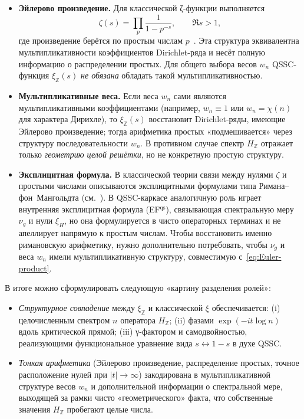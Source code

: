 \documentclass{article}
\numberwithin{equation}{section}
\theoremstyle{plain}
\theoremstyle{definition}
\theoremstyle{remark}
\def\leftrightarrow{↔}%
\def\infty{∞}\def\partial{∂}\def\sum{Σ}\def\int{∫}%
\begin{document}
\begin{itemize}
  \item
  \textbf{Эйлерово произведение.}
  Для классической ζ-функции выполняется
  \begin{equation}
  \label{eq:Euler-product}
  \zeta(s)
  =
  \prod_{p}
  \frac{1}{1-p^{-s}},
  \qquad \Re s>1,
  \end{equation}
  где произведение берётся по простым числам $p$~\cite{Titchmarsh1986}.
  Эта структура эквивалентна мультипликативности коэффициентов
  Dirichlet-ряда и несёт полную информацию о распределении простых.
  Для общего выбора весов $w_n$ QSSC-функция $\xi_{\mathbb Z}(s)$
  \emph{не обязана} обладать такой мультипликативностью.

  \item
  \textbf{Мультипликативные веса.}
  Если веса $w_n$ сами являются мультипликативными
  коэффициентами (например, $w_n\equiv 1$ или $w_n=\chi(n)$ для
  характера Дирихле), то $\xi_{\mathbb Z}(s)$ восстановит
  Dirichlet-ряды, имеющие Эйлерово произведение; тогда
  арифметика простых «подмешивается» через структуру
  последовательности $w_n$. В противном случае спектр $H_{\mathbb Z}$
  отражает только \emph{геометрию целой решётки}, но не конкретную
  простую структуру.

  \item
  \textbf{Эксплицитная формула.}
  В классической теории связи между нулями $\zeta$ и простыми числами
  описываются эксплицитными формулами типа Римана–фон~Мангольдта
  (см.~\cite{Edwards1974,Connes1994}). В QSSC-каркасе аналогичную роль
  играет внутренняя эксплицитная формула (EF$^{\mathrm{qs}}$),
  связывающая спектральную меру $\nu_g$ и нули $\xi_H$, но она формулируется
  в чисто операторных терминах и не апеллирует напрямую к простым
  числам. Чтобы восстановить именно римановскую арифметику, нужно
  дополнительно потребовать, чтобы $\nu_g$ и веса $w_n$ имели
  мультипликативную структуру, совместимую с~\eqref{eq:Euler-product}.
\end{itemize}

\medskip
\noindent
В итоге можно сформулировать следующую «картину разделения ролей»:

\begin{itemize}
  \item
  \emph{Структурное совпадение} между $\xi_{\mathbb Z}$ и классической
  $\xi$ обеспечивается:
  (i) целочисленным спектром $n$ оператора $H_{\mathbb Z}$;
  (ii) фазами $\exp(-it\log n)$ вдоль критической прямой;
  (iii) γ-фактором и самодвойностью, реализующими функциональное
  уравнение вида $s\leftrightarrow 1-s$ в духе QSSC.

  \item
  \emph{Тонкая арифметика} (Эйлерово произведение, распределение простых,
  точное расположение нулей при $|t|\to\infty$) закодирована в
  мультипликативной структуре весов $w_n$ и дополнительной информации
  о спектральной мере, выходящей за рамки чисто «геометрического»
  факта, что собственные значения $H_{\mathbb Z}$ пробегают целые
  числа.
\end{itemize}
\end{document}
